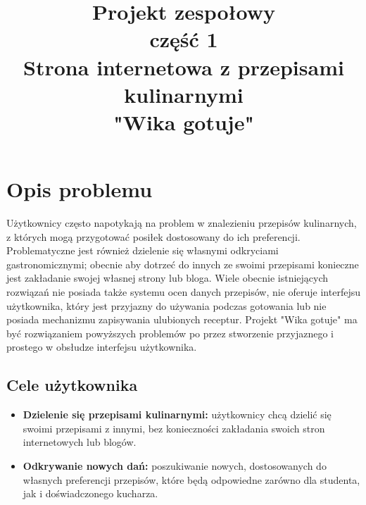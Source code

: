 \documentclass{article}
\title{\fontsize{20}{22}\selectfont Projekt zespołowy\\ część 1\\Strona internetowa z przepisami kulinarnymi\\"Wika gotuje"}
\date{}
\begin{document}
\maketitle
\newpage
\tableofcontents
\newpage

\section{Opis problemu}
\noindent
Użytkownicy często napotykają na problem w znalezieniu przepisów kulinarnych, z których mogą przygotować posiłek dostosowany do ich preferencji. Problematyczne jest również dzielenie
się własnymi odkryciami gastronomicznymi; obecnie aby dotrzeć do innych ze swoimi przepisami konieczne jest zakładanie swojej własnej strony lub bloga. Wiele obecnie istniejących
rozwiązań nie posiada także systemu ocen danych przepisów, nie oferuje interfejsu użytkownika, który jest przyjazny do używania podczas gotowania lub nie posiada mechanizmu zapisywania
ulubionych receptur. Projekt "Wika gotuje" ma być rozwiązaniem powyższych problemów po przez stworzenie przyjaznego i prostego w obsłudze interfejsu użytkownika.

\subsection{Cele użytkownika}
\begin{itemize}
    \item \textbf{Dzielenie się przepisami kulinarnymi:} użytkownicy chcą dzielić się swoimi przepisami z innymi, bez konieczności zakładania swoich stron internetowych lub blogów.
    \item \textbf{Odkrywanie nowych dań:} poszukiwanie nowych, dostosowanych do własnych preferencji przepisów, które będą odpowiedne zarówno dla studenta, jak i doświadczonego kucharza.
\end{itemize}
\end{document}
